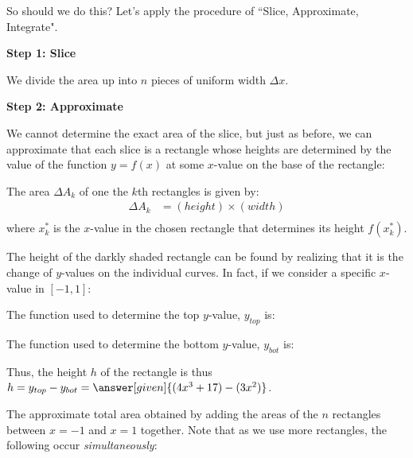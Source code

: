 \documentclass{ximera}
\begin{document}





So should we do this? Let's apply the procedure of ``Slice, Approximate, Integrate".

\textbf{Step 1: Slice}

We divide the area up into $n$ pieces of uniform width $\Delta x$.


\textbf{Step 2: Approximate}

We cannot determine the exact area of the slice, but just as before, we can approximate that each slice is a rectangle whose heights are determined by the value of the function $y = f(x)$ at some $x$-value on the base of the rectangle: 


\vspace{3mm}
The area $\Delta A_k$ of one the $k$th rectangles is given by: 
\begin{align*}
\Delta A_k & = (height) \times (width) \nonumber \\
\end{align*}
where $x_k^*$ is the $x$-value in the chosen rectangle that determines its height $f(x_k^*)$. 

The height of the darkly shaded rectangle can be found by realizing that it is the change of $y$-values on the individual curves. In fact, if we consider a specific $x$-value in $[-1,1]$:

\begin{question}
The function used to determine the top $y$-value, $y_{top}$ is:
\begin{multipleChoice}
\end{multipleChoice}
\end{question}

\begin{question}
The function used to determine the bottom $y$-value, $y_{bot}$ is:
\begin{multipleChoice}
\end{multipleChoice}
\end{question}

Thus, the height $h$ of the rectangle is thus $h=y_{top}-y_{bot} = \answer[given]{(4x^3+17)-(3x^2)}$.

The approximate total area obtained by adding the areas of the $n$ rectangles between $x=-1$ and $x=1$ together.  Note that as we use more rectangles, the following occur \emph{simultaneously}:
\end{document}
